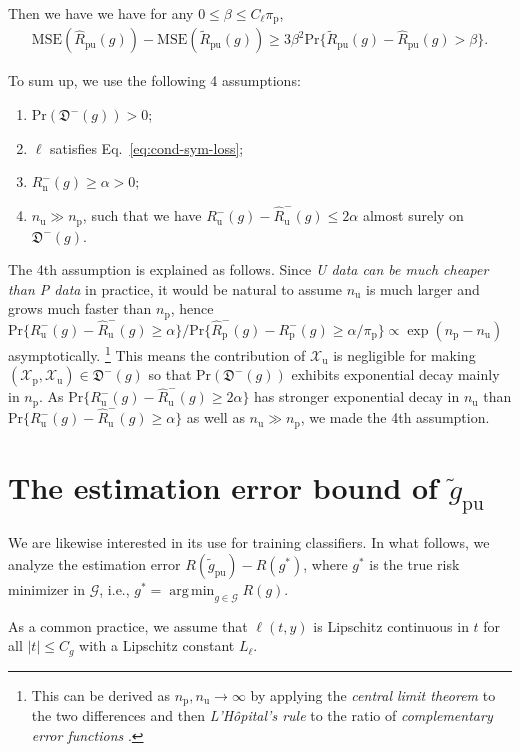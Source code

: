 \documentclass[12pt]{article}
\newcommand{\pr}{\mathrm{Pr}}
\newcommand{\mse}{\mathrm{MSE}}
\newcommand{\cG}{\mathcal{G}}
\newcommand{\cX}{\mathcal{X}}
\newcommand{\fD}{\mathfrak{D}}
\newcommand{\pip}{\pi_\mathrm{p}}
\newcommand{\Xp}{\cX_\mathrm{p}}
\newcommand{\Xu}{\cX_\mathrm{u}}
\newcommand{\Np}{{n_\mathrm{p}}}
\newcommand{\Nu}{{n_\mathrm{u}}}
\newcommand{\Rp}{R_\mathrm{p}}
\newcommand{\Rn}{R_\mathrm{n}}
\newcommand{\Ru}{R_\mathrm{u}}
\newcommand{\hRp}{\widehat{R}_\mathrm{p}}
\newcommand{\hRu}{\widehat{R}_\mathrm{u}}
\newcommand{\hRpu}{\widehat{R}_\mathrm{pu}}
\newcommand{\tRpu}{\widetilde{R}_\mathrm{pu}}
\newcommand{\tgpu}{\widetilde{g}_\mathrm{pu}}
\DeclareMathOperator*{\argmin}{\mathrm{arg\,min}}
\theoremstyle{definition}
\begin{document}
Then we have 
we have for any $0\le\beta\le C_\ell\pip$,
\begin{align}
\label{eq:mse-bound}%
\mse(\hRpu(g))-\mse(\tRpu(g))
\ge 3\beta^2\pr\{\tRpu(g)-\hRpu(g)>\beta\}.
\end{align}


To sum up, we use the following 4 assumptions:
\begin{enumerate}
	\item   $\pr(\fD^-(g))>0$;
	\item  $\ell$ satisfies Eq.~\eqref{eq:cond-sym-loss};
	\item  $\Rn^-(g)\ge\alpha>0$;
	\item  $\Nu\gg\Np$, such that we have $\Ru^-(g)-\hRu^-(g)\le2\alpha$ almost surely on $\fD^-(g)$.
\end{enumerate}

The 4th assumption is explained as follows.
Since \emph{U data can be much cheaper than P data} in practice, it would be natural to assume $\Nu$ is much larger and grows much faster than $\Np$, hence $\pr\{\Ru^-(g)-\hRu^-(g)\ge\alpha\}/\pr\{\hRp^-(g)-\Rp^-(g)\ge\alpha/\pip\}
\propto \exp(\Np-\Nu)$ asymptotically.%
\footnote{This can be derived as $\Np,\Nu\to\infty$ by applying the \emph{central limit theorem} to the two differences and then \emph{L'H\^{o}pital's rule} to the ratio of \emph{complementary error functions} .}
This means the contribution of $\Xu$ is negligible for making $(\Xp,\Xu)\in\fD^-(g)$ so that $\pr(\fD^-(g))$ exhibits exponential decay mainly in $\Np$. As $\pr\{\Ru^-(g)-\hRu^-(g)\ge2\alpha\}$ has stronger exponential decay in $\Nu$ than $\pr\{\Ru^-(g)-\hRu^-(g)\ge\alpha\}$ as well as $\Nu\gg\Np$, we made the 4th assumption.

\section{The estimation error bound of $\tgpu$}

We are likewise interested in its use for training classifiers. In what follows, we analyze the estimation error $R(\tgpu)-R(g^*)$, where $g^*$ is the true risk minimizer in $\cG$, i.e., $g^*=\argmin_{g\in\cG}R(g)$. 

As a common practice, we assume that $\ell(t,y)$ is Lipschitz continuous in $t$ for all $|t|\le C_g$ with a Lipschitz constant $L_\ell$.
\end{document}
